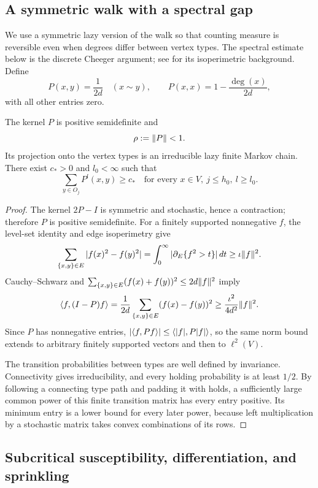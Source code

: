 \subsection{A symmetric walk with a spectral gap}
\label{pre:walk-subsection}

We use a symmetric lazy version of the walk so that counting measure
is reversible even when degrees differ between vertex types. The
spectral estimate below is the discrete Cheeger argument; see
\cite{Dodziuk1984} for its isoperimetric background. Define
\[
 P(x,y)=\frac1{2d}\quad(x\sim y),\qquad
 P(x,x)=1-\frac{\deg(x)}{2d},
\]
with all other entries zero.

\begin{lemma}\label{pre:walk}
The kernel $P$ is positive semidefinite and
\begin{equation}\label{eq:s03}
 \rho:=\lVert P\rVert<1.
\end{equation}
Its projection onto the vertex types is an irreducible lazy finite
Markov chain. There exist $c_*>0$ and $l_0<\infty$ such that
\[
 \sum_{y\in O_j}P^l(x,y)\ge c_*
 \quad\text{for every }x\in V,\ j\le h_0,\ l\ge l_0.
\]
\end{lemma}
\begin{proof}
The kernel $2P-I$ is symmetric and stochastic, hence a contraction;
therefore $P$ is positive semidefinite. For a finitely supported
nonnegative $f$, the level-set identity and edge isoperimetry give
\[
 \sum_{\{x,y\}\in E}|f(x)^2-f(y)^2|
 =\int_0^\infty|\partial_E\{f^2>t\}|\,dt
 \ge\iota\lVert f\rVert^2.
\]
Cauchy--Schwarz and
$\sum_{\{x,y\}\in E}(f(x)+f(y))^2\le2d\lVert f\rVert^2$ imply
\[
 \langle f,(I-P)f\rangle
 =\frac1{2d}\sum_{\{x,y\}\in E}(f(x)-f(y))^2
 \ge\frac{\iota^2}{4d^2}\lVert f\rVert^2.
\]
Since $P$ has nonnegative entries,
$|\langle f,Pf\rangle|\le\langle|f|,P|f|\rangle$, so the same norm bound extends to
arbitrary finitely supported vectors and then to $\ell^2(V)$.

The transition probabilities between types are well defined by
invariance. Connectivity gives irreducibility, and every holding
probability is at least $1/2$. By following a connecting type path
and padding it with holds, a sufficiently large common power of this
finite transition matrix has every entry positive. Its minimum entry
is a lower bound for every later power, because left multiplication
by a stochastic matrix takes convex combinations of its rows.
\end{proof}

\subsection{Subcritical susceptibility, differentiation, and sprinkling}
\label{pre:subcritical}

